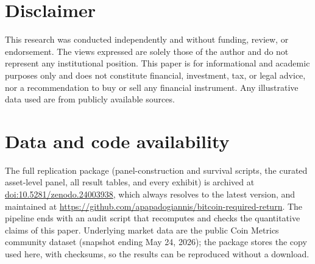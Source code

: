 \documentclass[11pt]{article}
\begin{document}
\section*{Disclaimer}
\noindent This research was conducted independently and without funding, review, or endorsement. The views expressed are solely those of the author and do not represent any institutional position. This paper is for informational and academic purposes only and does not constitute financial, investment, tax, or legal advice, nor a recommendation to buy or sell any financial instrument. Any illustrative data used are from publicly available sources.

\section*{Data and code availability}

\noindent The full replication package (panel-construction and survival scripts, the curated asset-level panel, all result tables, and every exhibit) is archived at \href{https://doi.org/10.5281/zenodo.24003938}{doi:10.5281/zenodo.24003938}, which always resolves to the latest version, and maintained at \url{https://github.com/apapadogiannis/bitcoin-required-return}. The pipeline ends with an audit script that recomputes and checks the quantitative claims of this paper. Underlying market data are the public Coin Metrics community dataset (snapshot ending May 24, 2026); the package stores the copy used here, with checksums, so the results can be reproduced without a download.
\end{document}
